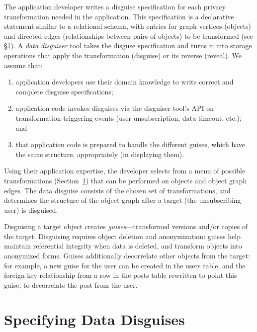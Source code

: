 %
The application developer writes a disguise specification for each privacy transformation needed
in the application.
%
This specification is a declarative statement similar to a relational schema, with entries for
graph vertices (objects) and directed edges (relationships between pairs of objects)
to be transformed (see \S\ref{sec:policies}).
%
A \emph{data disguiser} tool takes the disguse specification and turns it into storage
operations that apply the transformation (disguise) or its reverse (reveal).
%
%
We assume that:
\begin{enumerate}[nosep]
  \item application developers use their domain knowledge to write correct and complete
    disguise specifications;
  \item application code invokes disguises via the disguiser tool's API on
    transformation-triggering events (\eg user unsubscription, data timeout, etc.); and
  \item that application code is prepared to handle the different guises, which have the
    same structure, appropriately (\eg in displaying them).
\end{enumerate}

%
Using their application expertise, the developer selects from a menu of possible transformations
(Section~\ref{sec:policies}) that can be performed on objects and object graph edges.
The data disguise consists of the chosen set of transformations, and determines the
structure of the object graph after a target (\eg the unsubscribing user) is disguised.

Disguising a target object creates \emph{guises}---transformed versions and/or copies of the target.
Disguising requires object deletion and anonymization: guises help maintain referential integrity
when data is deleted, and transform objects into anonymized forms.  Guises additionally decorrelate
other objects from the target: for example, a new guise for the user can be created in the users
table, and the foreign key relationship from a row in the posts table rewritten to point this guise,
to decorrelate the post from the user.

\section{Specifying Data Disguises}
\label{sec:policies}


